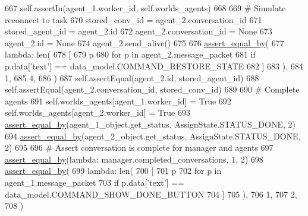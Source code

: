 \begin{DoxyCode}
667         self.assertIn(agent\_1.worker\_id, self.worlds\_agents)
668 
669         \textcolor{comment}{# Simulate reconnect to task}
670         stored\_conv\_id = agent\_2.conversation\_id
671         stored\_agent\_id = agent\_2.id
672         agent\_2.conversation\_id = \textcolor{keywordtype}{None}
673         agent\_2.id = \textcolor{keywordtype}{None}
674         agent\_2.send\_alive()
675 
676         \hyperlink{namespaceparlai_1_1mturk_1_1core_1_1test_1_1test__full__system_a0b463246d35658a2e422010f13dcf819}{assert\_equal\_by}(
677             \textcolor{keyword}{lambda}: len(
678                 [
679                     p
680                     \textcolor{keywordflow}{for} p \textcolor{keywordflow}{in} agent\_2.message\_packet
681                     \textcolor{keywordflow}{if} p.data[\textcolor{stringliteral}{'text'}] == data\_model.COMMAND\_RESTORE\_STATE
682                 ]
683             ),
684             1,
685             4,
686         )
687         self.assertEqual(agent\_2.id, stored\_agent\_id)
688         self.assertEqual(agent\_2.conversation\_id, stored\_conv\_id)
689 
690         \textcolor{comment}{# Complete agents}
691         self.worlds\_agents[agent\_1.worker\_id] = \textcolor{keyword}{True}
692         self.worlds\_agents[agent\_2.worker\_id] = \textcolor{keyword}{True}
693         \hyperlink{namespaceparlai_1_1mturk_1_1core_1_1test_1_1test__full__system_a0b463246d35658a2e422010f13dcf819}{assert\_equal\_by}(agent\_1\_object.get\_status, AssignState.STATUS\_DONE, 2)
694         \hyperlink{namespaceparlai_1_1mturk_1_1core_1_1test_1_1test__full__system_a0b463246d35658a2e422010f13dcf819}{assert\_equal\_by}(agent\_2\_object.get\_status, AssignState.STATUS\_DONE, 2)
695 
696         \textcolor{comment}{# Assert conversation is complete for manager and agents}
697         \hyperlink{namespaceparlai_1_1mturk_1_1core_1_1test_1_1test__full__system_a0b463246d35658a2e422010f13dcf819}{assert\_equal\_by}(\textcolor{keyword}{lambda}: manager.completed\_conversations, 1, 2)
698         \hyperlink{namespaceparlai_1_1mturk_1_1core_1_1test_1_1test__full__system_a0b463246d35658a2e422010f13dcf819}{assert\_equal\_by}(
699             \textcolor{keyword}{lambda}: len(
700                 [
701                     p
702                     \textcolor{keywordflow}{for} p \textcolor{keywordflow}{in} agent\_1.message\_packet
703                     \textcolor{keywordflow}{if} p.data[\textcolor{stringliteral}{'text'}] == data\_model.COMMAND\_SHOW\_DONE\_BUTTON
704                 ]
705             ),
706             1,
707             2,
708         )

\end{DoxyCode}
